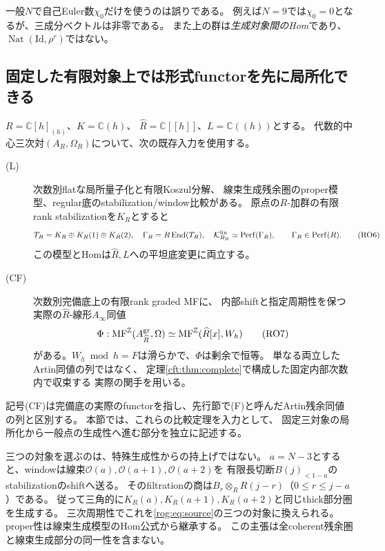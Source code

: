 \begin{remark}
一般$N$で自己Euler数$\chi_0$だけを使うのは誤りである。
例えば$N=9$では$\chi_0=0$となるが、三成分ベクトルは非零である。
また上の群は\emph{生成対象間のHom}であり、$\operatorname{Nat}(\mathrm{Id},\rho^r)$ではない。
\end{remark}

\subsection{固定した有限対象上では形式functorを先に局所化できる}

$R=\mathbb C[h]_{(h)}$、$K=\mathbb C(h)$、
$\widehat R=\mathbb C[[h]]$、$L=\mathbb C((h))$とする。
代数的中心三次対$(A_R,\Omega_R)$について、次の既存入力を使用する。
\begin{description}
\item[\textup{(L)}] 次数別flatな局所量子化と有限Koszul分解、
線束生成残余圏のproper模型、regular底のstabilization/window比較がある。
原点の$R$-加群の有限rank stabilizationを$K_R$とすると
\[
 T_R=K_R\oplus K_R(1)\oplus K_R(2),\quad
 \Gamma_R=R\operatorname{End}(T_R),\quad
 \mathcal K^{\rm lin}_{B_R}\simeq\operatorname{Perf}(\Gamma_R),
 \qquad \Gamma_R\in\operatorname{Perf}(R).
 \tag{RO6}\label{rog:eq:source}
\]
この模型とHomは$\widehat R,L$への平坦底変更に両立する。
\item[\textup{(CF)}] 次数別完備底上の有限rank graded MFに、
内部shiftと指定周期性を保つ実際の$\widehat R$-線形$A_\infty$同値
\[
 \Phi:\operatorname{MF}^{\mathbb Z}(A^{\rm gr}_{\widehat R},\Omega)
 \simeq\operatorname{MF}^{\mathbb Z}(\widehat R[x],W_h)
 \tag{RO7}\label{rog:eq:completed}
\]
がある。$W_h\bmod h=F$は滑らかで、$\Phi$は剰余で恒等。
単なる両立したArtin同値の列ではなく、
定理\ref{cft:thm:complete}で構成した固定内部次数内で収束する
実際の関手を用いる。
\end{description}
記号(CF)は完備底の実際のfunctorを指し、先行節で(F)と呼んだArtin残余同値の列と区別する。
本節では、これらの比較定理を入力として、
固定三対象の局所化から一般点の生成性へ進む部分を独立に記述する。

\begin{remark}
三つの対象を選ぶのは、特殊生成性からの持上げではない。
$a=N-3$とすると、windowは線束$\mathcal O(a),\mathcal O(a+1),\mathcal O(a+2)$を
有限長切断$B(j)_{<1-a}$のstabilizationのshiftへ送る。
そのfiltrationの商は$B_r\otimes_RR(j-r)$（$0\le r\le j-a$）である。
従って三角的に$K_R(a),K_R(a+1),K_R(a+2)$と同じthick部分圏を生成する。
三次周期性でこれを\eqref{rog:eq:source}の三つの対象に換えられる。
proper性は線束生成模型のHom公式から継承する。
この主張は全coherent残余圏と線束生成部分の同一性を含まない。
\end{remark}

